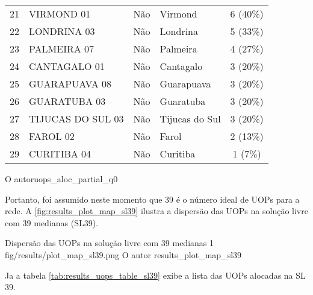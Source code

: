 {\begin{tabular}{l|l|l|l|c}
21 &                 VIRMOND 01 &   Não &                 Virmond &  6 (40\%) \\
22 &                LONDRINA 03 &   Não &                Londrina &  5 (33\%) \\
23 &                PALMEIRA 07 &   Não &                Palmeira &  4 (27\%) \\
24 &               CANTAGALO 01 &   Não &               Cantagalo &  3 (20\%) \\
25 &              GUARAPUAVA 08 &   Não &              Guarapuava &  3 (20\%) \\
26 &               GUARATUBA 03 &   Não &               Guaratuba &  3 (20\%) \\
27 &          TIJUCAS DO SUL 03 &   Não &          Tijucas do Sul &  3 (20\%) \\
28 &                   FAROL 02 &   Não &                   Farol &  2 (13\%) \\
29 &                CURITIBA 04 &   Não &                Curitiba &   1 (7\%) \\
 \hline
\end{tabular}}
{O autor}{uops_aloc_partial_q0}{}{}

Portanto, foi assumido neste momento que 39 é o número ideal de UOPs para a rede. A \autoref{fig:results_plot_map_sl39} ilustra a dispersão das UOPs na solução livre com 39 medianas (SL39).

\figurah
{Dispersão das UOPs na solução livre com 39 medianas}
{1}
{fig/results/plot_map_sl39.png}
{O autor}
{results_plot_map_sl39}
{}
{}

Ja a tabela \autoref{tab:results_uops_table_sl39} exibe a lista das UOPs alocadas na SL 39.

